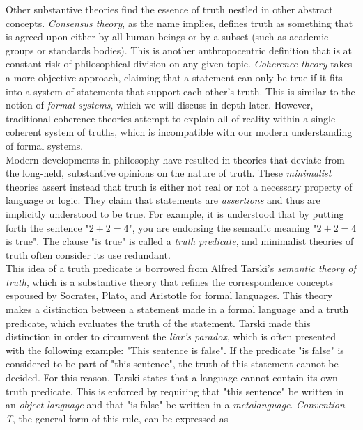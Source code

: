\begin{tcolorbox}[breakable, enhanced, colback=textbook-blue, sharp corners]
	Other substantive theories find the essence of truth nestled in other abstract concepts. \textit{Consensus theory}, as the name implies, defines truth as something that is agreed upon either by all human beings or by a subset (such as academic groups or standards bodies). This is another anthropocentric definition that is at constant risk of philosophical division on any given topic. \textit{Coherence theory} takes a more objective approach, claiming that a statement can only be true if it fits into a system of statements that support each other's truth. This is similar to the notion of \textit{formal systems}, which we will discuss in depth later. However, traditional coherence theories attempt to explain all of reality within a single coherent system of truths, which is incompatible with our modern understanding of formal systems. \\
	
	Modern developments in philosophy have resulted in theories that deviate from the long-held, substantive opinions on the nature of truth. These \textit{minimalist} theories assert instead that truth is either not real or not a necessary property of language or logic. They claim that statements are \textit{assertions} and thus are implicitly understood to be true. For example, it is understood that by putting forth the sentence "$2+2=4$", you are endorsing the semantic meaning "$2+2=4$ is true". The clause "is true" is called a \textit{truth predicate}, and minimalist theories of truth often consider its use redundant. \\
	
	This idea of a truth predicate is borrowed from Alfred Tarski's \textit{semantic theory of truth}, which is a substantive theory that refines the correspondence concepts espoused by Socrates, Plato, and Aristotle for formal languages. This theory makes a distinction between a statement made in a formal language and a truth predicate, which evaluates the truth of the statement. Tarski made this distinction in order to circumvent the \textit{liar's paradox}, which is often presented with the following example: "This sentence is false". If the predicate "is false" is considered to be part of "this sentence", the truth of this statement cannot be decided. For this reason, Tarski states that a language cannot contain its own truth predicate. This is enforced by requiring that "this sentence" be written in an \textit{object language} and that "is false" be written in a \textit{metalanguage}. \textit{Convention T}, the general form of this rule, can be expressed as
	

\end{tcolorbox}
